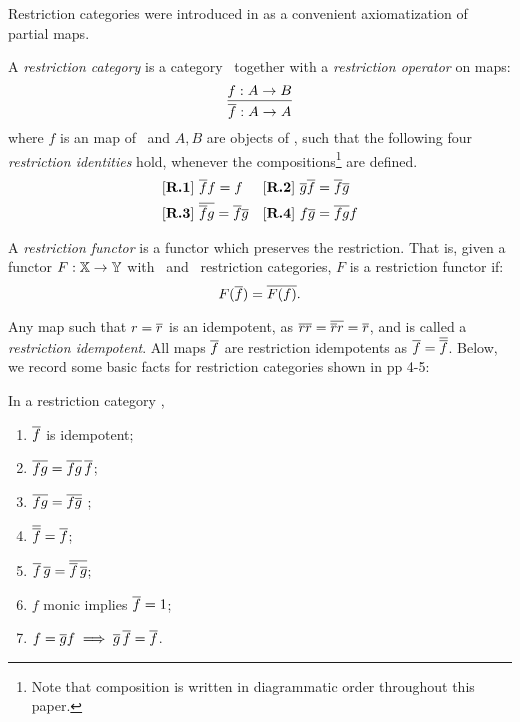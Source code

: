 Restriction categories were introduced in
 \cite{cockett2002:restcategories1} as a convenient axiomatization of partial maps.
\begin{definition}\label{def:restriction_category}
  A \emph{restriction category} is a category \X\ together with a \emph{restriction operator} on
  maps:
  \[
    \infer{\restr{f}:A\to A}{f:A \to B}
  \]
  where $f$ is an map of \X\ and $A,B$ are objects of \X, such that the
  following four \emph{restriction identities} hold, whenever the
  compositions\footnote{Note that composition is
  written in diagrammatic order throughout this paper.} are defined.
  \begin{align*}
    &[\text{\bfseries {R}.{1}}]\ \overline{f} f = f & &
    [\text{\bfseries {R}.{2}}]\ \overline{g}  \overline{f} = \overline{f}  \overline{g}\\
    &[\text{\bfseries {R}.{3}}]\ \overline{\overline{f}  g} = \overline{f}   \overline{g} & &
    [\text{\bfseries {R}.{4}}]\  f \overline{g} = \overline{f g} f
  \end{align*}
\end{definition}

\begin{definition}
  A \emph{restriction functor} is a functor which preserves the restriction. That is,
  given a functor $F: \mathbb{X} \to \mathbb{Y}$ with \X\  and \Y\ restriction categories,
  $F$ is a restriction functor if:
  \[
    F(\overline{f}) = \overline{F(f)}.
  \]
\end{definition}

Any map such that $r=\overline{r}$ is an idempotent, as $\overline{r}\overline{r} = \overline{\overline{r} r} = \overline{r}$,
and is called a \emph{restriction idempotent}. All maps $\overline{f}$ are restriction idempotents as
$\overline{f}=\overline{\overline{f}}$. Below, we record some basic facts for restriction categories
shown in \cite{cockett2002:restcategories1} pp 4-5:
\begin{lemma}\label{lem:restrictionvarious}
  In a restriction category \X,
  \begin{multicols}{2}
    \begin{enumerate}[{(}i{)}]
      \item{}$\overline{f}$ is idempotent;
      \item{} $\overline{f g} = \overline{f g} \, \overline{f}$;\label{lemitem:rv_2}
      \item{} $\overline{f g} = \overline{f \overline{g}}$ ;\label{lemitem:rv_3}
      \item{} $\overline{\overline{f}} = \overline{f}$;
      \item{} $\overline{f}\,\overline{g} = \overline{\overline{f}\,\overline{g}}$;
      \item{} $f$ monic implies $\overline{f} = 1$;
      \item{} $f = \overline{g} f \implies \overline{g}\,\overline{f} = \overline{f}$.
      \\
    \end{enumerate}
  \end{multicols}
\end{lemma}

